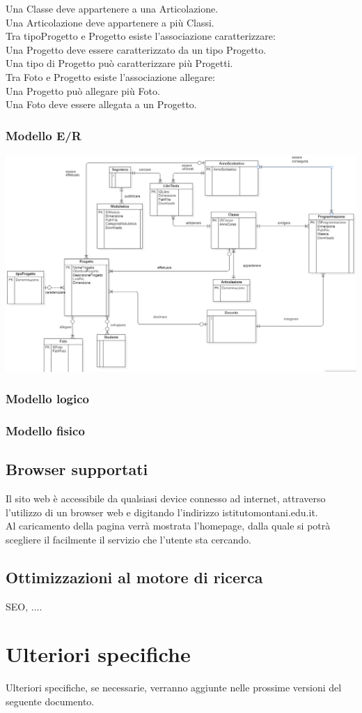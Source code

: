 \documentclass{article}
\begin{document}
	Una Classe deve appartenere a una Articolazione.\\
	Una Articolazione deve appartenere a più Classi.\\
	\vspace{2mm}
	Tra tipoProgetto e Progetto esiste l’associazione caratterizzare:\\
	Una Progetto deve essere caratterizzato da un tipo Progetto.\\
	Una tipo di Progetto può caratterizzare più Progetti.\\
	\vspace{2mm}
	Tra Foto e Progetto esiste l’associazione allegare:\\
	Una Progetto può allegare più Foto.\\
	Una Foto deve essere allegata a un Progetto.\\
	\subsubsection{\textbf{Modello E/R}}
\includegraphics[scale=0.4]{modelloer.png}
	\subsubsection{\textbf{Modello logico}}
	\subsubsection{\textbf{Modello fisico}}
	\subsection{\textbf{Browser supportati}}
	Il sito web è accessibile da qualsiasi device connesso ad internet, attraverso l'utilizzo di un browser web e digitando l'indirizzo istitutomontani.edu.it.\\
	Al caricamento della pagina verrà mostrata l'homepage, dalla quale si potrà scegliere il facilmente il servizio che l'utente sta cercando. 
	
	\subsection{\textbf{Ottimizzazioni al motore di ricerca}}
	SEO, ....	
\clearpage
	
\section{\textbf{Ulteriori specifiche}}
Ulteriori specifiche, se necessarie, verranno aggiunte nelle prossime versioni del seguente documento.
\end{document}
